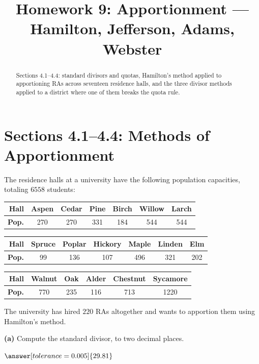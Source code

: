 \documentclass[12pt]{ximera}
\title{Homework 9: Apportionment --- Hamilton, Jefferson, Adams, Webster}
\begin{document}
\begin{abstract}
Sections 4.1--4.4: standard divisors and quotas, Hamilton's method applied to
apportioning RAs across seventeen residence halls, and the three divisor methods
applied to a district where one of them breaks the quota rule.
\end{abstract}
\maketitle

\section*{Sections 4.1--4.4: Methods of Apportionment}

\begin{problem}
The residence halls at a university have the following population capacities,
totaling $6558$ students:

\begin{center}
\begin{tabular}{r|c|c|c|c|c|c}
\textbf{Hall} & Aspen & Cedar & Pine & Birch & Willow & Larch \\\hline
\textbf{Pop.} & 270 & 270 & 331 & 184 & 544 & 544 \\
\end{tabular}

\smallskip
\begin{tabular}{r|c|c|c|c|c|c}
\textbf{Hall} & Spruce & Poplar & Hickory & Maple & Linden & Elm \\\hline
\textbf{Pop.} & 99 & 136 & 107 & 496 & 321 & 202 \\
\end{tabular}

\smallskip
\begin{tabular}{r|c|c|c|c|c}
\textbf{Hall} & Walnut & Oak & Alder & Chestnut & Sycamore \\\hline
\textbf{Pop.} & 770 & 235 & 116 & 713 & 1220 \\
\end{tabular}
\end{center}

The university has hired $220$ RAs altogether and wants to apportion them using
Hamilton's method.

\begin{prompt}
\textbf{(a)} Compute the standard divisor, to two decimal places.

$\answer[tolerance=0.005]{29.81}$


\end{prompt}
\end{problem}
\end{document}
